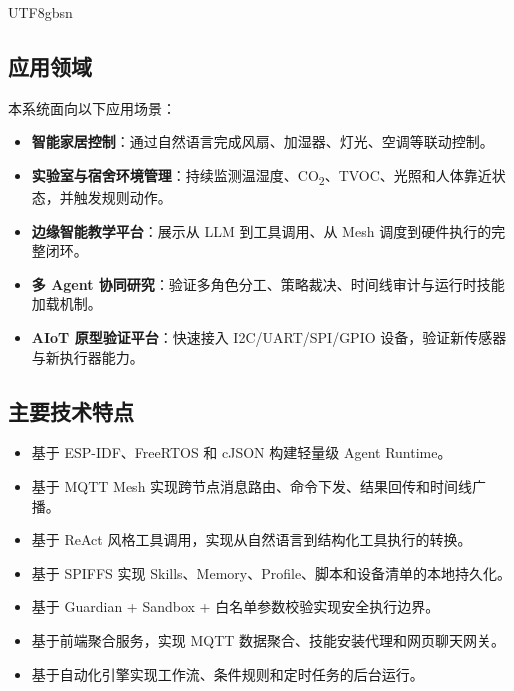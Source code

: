 \documentclass[a4paper,12pt]{article}
\begin{document}
\begin{CJK*}{UTF8}{gbsn}
\subsection{应用领域}
本系统面向以下应用场景：
\begin{itemize}
  \item \textbf{智能家居控制}：通过自然语言完成风扇、加湿器、灯光、空调等联动控制。
  \item \textbf{实验室与宿舍环境管理}：持续监测温湿度、CO\textsubscript{2}、TVOC、光照和人体靠近状态，并触发规则动作。
  \item \textbf{边缘智能教学平台}：展示从 LLM 到工具调用、从 Mesh 调度到硬件执行的完整闭环。
  \item \textbf{多 Agent 协同研究}：验证多角色分工、策略裁决、时间线审计与运行时技能加载机制。
  \item \textbf{AIoT 原型验证平台}：快速接入 I2C/UART/SPI/GPIO 设备，验证新传感器与新执行器能力。
\end{itemize}

\subsection{主要技术特点}
\begin{itemize}
  \item 基于 ESP-IDF、FreeRTOS 和 cJSON 构建轻量级 Agent Runtime。
  \item 基于 MQTT Mesh 实现跨节点消息路由、命令下发、结果回传和时间线广播。
  \item 基于 ReAct 风格工具调用，实现从自然语言到结构化工具执行的转换。
  \item 基于 SPIFFS 实现 Skills、Memory、Profile、脚本和设备清单的本地持久化。
  \item 基于 Guardian + Sandbox + 白名单参数校验实现安全执行边界。
  \item 基于前端聚合服务，实现 MQTT 数据聚合、技能安装代理和网页聊天网关。
  \item 基于自动化引擎实现工作流、条件规则和定时任务的后台运行。
\end{itemize}


\end{CJK*}
\end{document}
